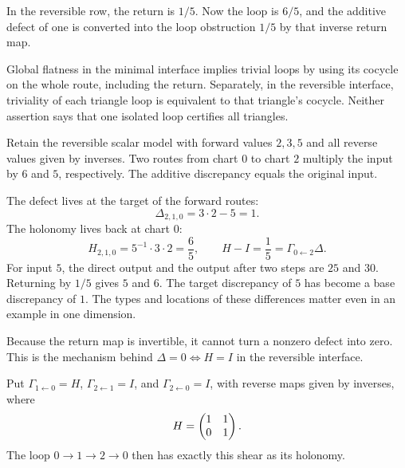 In the reversible row, the return is $1/5$. Now the loop is $6/5$, and the additive defect of one is converted into the loop obstruction $1/5$ by that inverse return map.

Global flatness in the minimal interface implies trivial loops by using its cocycle on the whole route, including the return. Separately, in the reversible interface, triviality of each triangle loop is equivalent to that triangle's cocycle. Neither assertion says that one isolated loop certifies all triangles.


Retain the reversible scalar model with forward values $2,3,5$ and all reverse values given by inverses. Two routes from chart $0$ to chart $2$ multiply the input by $6$ and $5$, respectively. The additive discrepancy equals the original input.


The defect lives at the target of the forward routes:
\[
\Delta_{2,1,0}=3\cdot2-5=1.
\]
The holonomy lives back at chart $0$:
\[
H_{2,1,0}=5^{-1}\cdot3\cdot2=\frac65,
\qquad H-I=\frac15=\Gamma_{0\leftarrow2}\Delta.
\]
For input $5$, the direct output and the output after two steps are $25$ and $30$. Returning by $1/5$ gives $5$ and $6$. The target discrepancy of $5$ has become a base discrepancy of $1$. The types and locations of these differences matter even in an example in one dimension.

Because the return map is invertible, it cannot turn a nonzero defect into zero. This is the mechanism behind $\Delta=0\Longleftrightarrow H=I$ in the reversible interface.


Put $\Gamma_{1\leftarrow0}=H$, $\Gamma_{2\leftarrow1}=I$, and $\Gamma_{2\leftarrow0}=I$, with reverse maps given by inverses, where
\[
H=\begin{pmatrix}1&1\\0&1\end{pmatrix}.
\]
The loop $0\to1\to2\to0$ then has exactly this shear as its holonomy.

